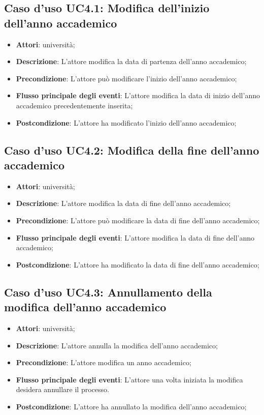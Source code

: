 \subsection{Caso d'uso \texorpdfstring{UC4.1}{UC4.1}: Modifica dell'inizio dell'anno accademico}
\begin{itemize}
\item \textbf{Attori}: università;
\item \textbf{Descrizione}: L'attore modifica la data di partenza dell'anno accademico;
\item \textbf{Precondizione}: L'attore può modificare l'inizio dell'anno accademico;
\item \textbf{Flusso principale degli eventi}: L'attore modifica la data di inizio dell'anno accademico precedentemente inserita;
\item \textbf{Postcondizione}: L'attore ha modificato l'inizio dell'anno accademico;
\end{itemize}
\subsection{Caso d'uso \texorpdfstring{UC4.2}{UC4.2}: Modifica della fine dell'anno accademico}
\begin{itemize}
\item \textbf{Attori}: università;
\item \textbf{Descrizione}: L'attore modifica la data di fine dell'anno accademico;
\item \textbf{Precondizione}: L'attore può modificare la data di fine dell'anno accademico;
\item \textbf{Flusso principale degli eventi}: L'attore modifica la data di fine dell'anno accademico;
\item \textbf{Postcondizione}: L'attore ha modificato la data di fine dell'anno accademico;
\end{itemize}
\subsection{Caso d'uso \texorpdfstring{UC4.3}{UC4.3}: Annullamento della modifica dell'anno accademico}
\begin{itemize}
\item \textbf{Attori}: università;
\item \textbf{Descrizione}: L'attore annulla la modifica dell'anno accademico;
\item \textbf{Precondizione}: L'attore modifica un anno accademico;
\item \textbf{Flusso principale degli eventi}: L'attore una volta iniziata la modifica desidera annullare il processo.
\item \textbf{Postcondizione}: L'attore ha annullato la modifica dell'anno accademico;
\end{itemize}
